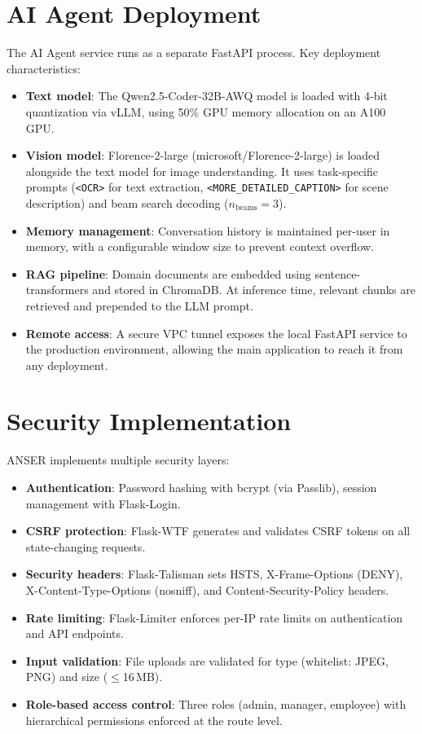 \documentclass[11pt,a4paper]{report}
\begin{document}
\section{AI Agent Deployment}

The AI Agent service runs as a separate FastAPI process. Key deployment characteristics:

\begin{itemize}
  \item \textbf{Text model}: The Qwen2.5-Coder-32B-AWQ model is loaded with 4-bit quantization via vLLM, using 50\% GPU memory allocation on an A100 GPU.
  \item \textbf{Vision model}: Florence-2-large (microsoft/Florence-2-large) is loaded alongside the text model for image understanding. It uses task-specific prompts (\texttt{<OCR>} for text extraction, \texttt{<MORE\_DETAILED\_CAPTION>} for scene description) and beam search decoding ($n_\text{beams}=3$).
  \item \textbf{Memory management}: Conversation history is maintained per-user in memory, with a configurable window size to prevent context overflow.
  \item \textbf{RAG pipeline}: Domain documents are embedded using sentence-transformers and stored in ChromaDB. At inference time, relevant chunks are retrieved and prepended to the LLM prompt.
  \item \textbf{Remote access}: A secure VPC tunnel exposes the local FastAPI service to the production environment, allowing the main application to reach it from any deployment.
\end{itemize}

\section{Security Implementation}

ANSER implements multiple security layers:

\begin{itemize}
  \item \textbf{Authentication}: Password hashing with bcrypt (via Passlib), session management with Flask-Login.
  \item \textbf{CSRF protection}: Flask-WTF generates and validates CSRF tokens on all state-changing requests.
  \item \textbf{Security headers}: Flask-Talisman sets HSTS, X-Frame-Options (DENY), X-Content-Type-Options (nosniff), and Content-Security-Policy headers.
  \item \textbf{Rate limiting}: Flask-Limiter enforces per-IP rate limits on authentication and API endpoints.
  \item \textbf{Input validation}: File uploads are validated for type (whitelist: JPEG, PNG) and size ($\leq$16\,MB).
  \item \textbf{Role-based access control}: Three roles (admin, manager, employee) with hierarchical permissions enforced at the route level.
\end{itemize}
\end{document}
